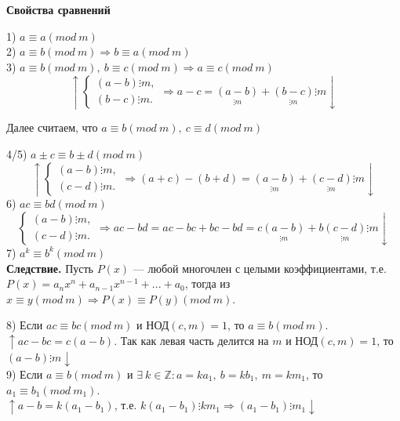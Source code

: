 \documentclass{article}
\begin{document}
            \textbf{Свойства сравнений}
            
            1) \( a \equiv a (mod\ m) \)\\
            2) \( a \equiv b (mod\ m) \Rightarrow b \equiv a (mod\ m) \)\\
            3) \( a \equiv b (mod\ m),\ b \equiv c (mod\ m) \Rightarrow a \equiv c (mod\ m) \)
            \[ \uparrow
                \begin{cases}
                    (a - b) \vdots m,\\
                    (b - c) \vdots m.
                \end{cases} \Rightarrow a - c = \underset{\vdots m}{(a - b)} + \underset{\vdots m}{(b - c)} \vdots m \downarrow \]
            \centerline{Далее считаем, что \( a \equiv b (mod\ m),\ c \equiv d (mod\ m) \)}
            4/5) \( a \pm c \equiv b \pm d (mod\ m) \)
            \[ \uparrow
                \begin{cases}
                    (a - b) \vdots m,\\
                    (c - d) \vdots m.
                \end{cases}
            \Rightarrow (a + c) - (b + d) = \underset{\vdots m}{(a - b)} + \underset{\vdots m}{(c - d)} \vdots m \downarrow \]
            6) \( ac \equiv bd (mod\ m) \) 
            \[ 
                \begin{cases}
                    (a - b) \vdots m,\\
                    (c - d) \vdots m.
                \end{cases}
            \Rightarrow ac - bd = ac - bc + bc - bd = c\underset{\vdots m}{(a - b)} + b\underset{\vdots m}{(c - d)} \vdots m \downarrow \]
            7) \( a^k \equiv b^k (mod\ m) \)\\
            \textbf{Следствие.} Пусть \(P(x)\) --- любой многочлен с целыми коэффициентами, т.е. \(P(x) = a_nx^n + a_{n - 1}x^{n - 1} + ... + a_0\), тогда из \(x \equiv y (mod\ m) \Rightarrow P(x) \equiv P(y) (mod\ m)\).

            8) Если \(ac \equiv bc (mod\ m)\) и \(\textrm{НОД}(c,m) = 1\), то \(a \equiv b (mod\ m)\).\\
            \(\uparrow ac - bc = c(a - b)\). Так как левая часть делится на \(m\) и \(\textrm{НОД}(c,m) = 1\), то \((a - b) \vdots m \downarrow \)\\
            9) Если \(a \equiv b (mod\ m)\) и \(\exists\ k \in \mathbb{Z}: a = ka_1,\ b = kb_1,\ m = km_1\), то \(a_1 \equiv b_1 (mod\ m_1)\).\\
            \( \uparrow a - b = k(a_1 - b_1) \), т.е. \( k(a_1 - b_1) \vdots km_1 \Rightarrow (a_1 - b_1) \vdots m_1 \downarrow \)
\end{document}

